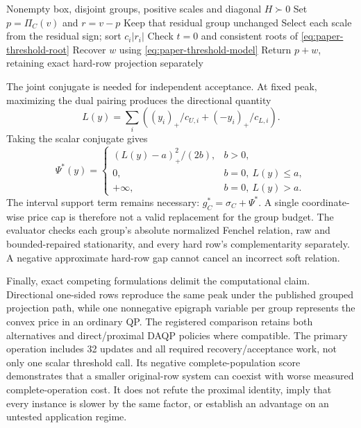 \begin{algorithm}[htbp]
\caption{Evaluate the directional disjoint-group proximal map with a fixed diagonal metric, retaining exact endpoint, zero-price and original-row semantics for independent numerical acceptance.}\label{alg:paper-directional}
\begin{algorithmic}[1]
\Require Nonempty box, disjoint groups, positive scales and diagonal $H\succ0$
\State Set $p=\Pi_C(v)$ and $r=v-p$
\State Keep that residual group unchanged
\Else
\State Select each scale from the residual sign; sort $c_i|r_i|$
\State Check $t=0$ and consistent roots of \eqref{eq:paper-threshold-root}
\State Recover $w$ using \eqref{eq:paper-threshold-model}
\EndIf
\EndFor
\State Return $p+w$, retaining exact hard-row projection separately
\end{algorithmic}
\end{algorithm}

The joint conjugate is needed for independent acceptance. At fixed peak,
maximizing the dual pairing produces the directional quantity
\begin{equation}\label{eq:paper-dual-budget}
 L(y)=\sum_i\left((y_i)_+/c_{U,i}+(-y_i)_+/c_{L,i}\right).
\end{equation}
Taking the scalar conjugate gives
\begin{equation}\label{eq:paper-peak-conjugate}
 \Psi^*(y)=\begin{cases}
 (L(y)-a)_+^2/(2b),&b>0,\\
 0,&b=0,\ L(y)\leq a,\\
 +\infty,&b=0,\ L(y)>a.
 \end{cases}
\end{equation}
The interval support term remains necessary: $g_C^*=\sigma_C+\Psi^*$.
A single coordinate-wise price cap is therefore not a valid replacement
for the group budget. The evaluator checks each group's absolute
normalized Fenchel relation, raw and bounded-repaired stationarity,
and every hard row's complementarity separately. A negative approximate
hard-row gap cannot cancel an incorrect soft relation.

Finally, exact competing formulations delimit the computational claim.
Directional one-sided rows reproduce the same peak under the published
grouped projection path, while one nonnegative epigraph variable per
group represents the convex price in an ordinary QP. The registered
comparison retains both alternatives and direct/proximal DAQP policies
where compatible. The primary operation includes 32 updates and all
required recovery/acceptance work, not only one scalar threshold call.
Its negative complete-population score demonstrates that a smaller
original-row system can coexist with worse measured complete-operation
cost. It does not refute the proximal identity, imply that every
instance is slower by the same factor, or establish an advantage on
an untested application regime.

